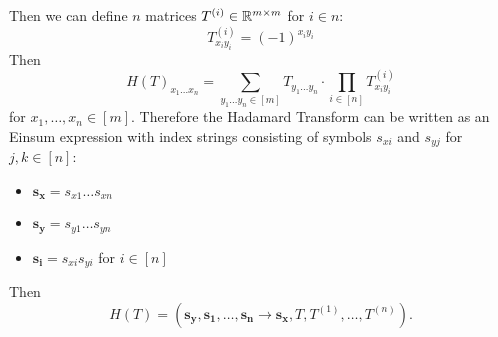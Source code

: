 Then we can define $n$ matrices $T^{(i)} \in \mathbb{R}^{m \times m}$ for $i \in n$:
$$T^{(i)}_{x_i y_i} = (-1)^{x_i y_i}$$
Then
$$H(T)_{x_1 \dots x_n} = \sum\limits_{y_1 \dots y_n \in [m]} T_{y_1 \dots y_n} \cdot \prod\limits_{i \in [n]} T^{(i)}_{x_i y_i}$$
for $x_1,\dots,x_n \in [m]$.
Therefore the Hadamard Transform can be written as an Einsum expression with index strings consisting of symbols $s_{xi}$ and $s_{yj}$ for $j,k \in [n]$:
\begin{itemize}
    \item $\bm{s_x} = s_{x1}\dots s_{x n}$
    \item $\bm{s_y} = s_{y1}\dots s_{y n}$
    \item $\bm{s_i} = s_{xi} s_{yi}$ for $i \in [n]$
\end{itemize}
Then
$$H(T) = (\bm{s_y}, \bm{s_1}, \dots, \bm{s_n} \rightarrow \bm{s_x}, T, T^{(1)}, \dots, T^{(n)}).$$